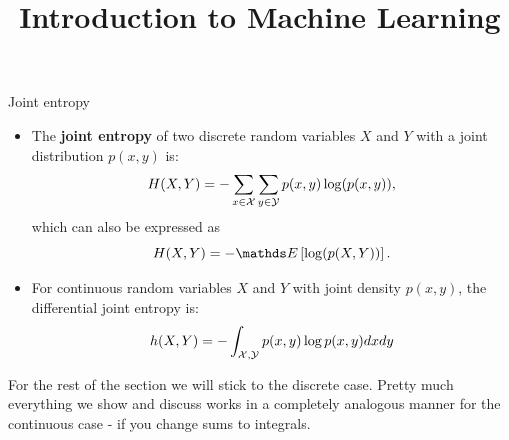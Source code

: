 \documentclass[11pt,compress,t,notes=noshow, xcolor=table]{beamer}
\title{Introduction to Machine Learning}
\date{}
\begin{document}


\begin{vbframe}{Joint entropy}
\begin{itemize}
  \item The \textbf{joint entropy} of two discrete random variables $X$ and $Y$ with a joint distribution $p(x, y)$ is:
  $$ H(X,Y) = -\sum_{x \in \mathcal{X}} \sum_{y \in \mathcal{Y}}  p(x,y) \log(p(x,y)),$$ 
  which can also be expressed as $$ H(X,Y) = -\E \left[ \log(p(X,Y)) \right].$$
  \item For continuous random variables $X$ and $Y$ with joint density $p(x,y)$, the differential joint entropy is:\\
  $$ h(X,Y) = - \int_{\mathcal{X},\mathcal{Y}} p(x,y) \log p(x,y) dx dy$$
\end{itemize}

\begin{footnotesize}
For the rest of the section we will stick to the discrete case. Pretty much everything we show and discuss works in a completely analogous manner for the continuous case - if you change sums to integrals.
\end{footnotesize}

\end{vbframe}
\end{document}
